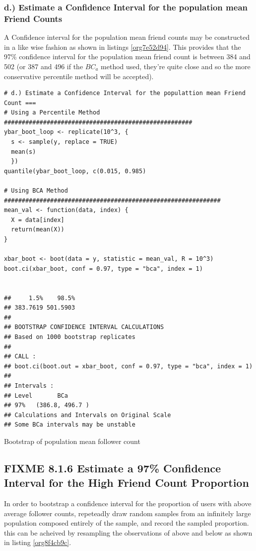 \documentclass[11pt]{article}
\begin{document}
\subsubsection{d.) Estimate a Confidence Interval for the population mean Friend Counts}
\label{sec:orgb95435c}
A Confidence interval for the population mean friend counts may be constructed in a like wise fashion as shown in listings \ref{org7e52d94}. This provides that the 97\% confidence interval for the population mean friend count is between 384 and 502 (or 387 and 496 if the \(BC_{a}\) method used, they're quite close and so the more conservative percentile method will be accepted).

\begin{listing}[htbp]
\begin{verbatim}
# d.) Estimate a Confidence Interval for the populattion mean Friend Count ===
# Using a Percentile Method #####################################################
ybar_boot_loop <- replicate(10^3, {
  s <- sample(y, replace = TRUE)
  mean(s)
  })
quantile(ybar_boot_loop, c(0.015, 0.985)

# Using BCA Method #############################################################
mean_val <- function(data, index) {
  X = data[index]
  return(mean(X))
}

xbar_boot <- boot(data = y, statistic = mean_val, R = 10^3)
boot.ci(xbar_boot, conf = 0.97, type = "bca", index = 1)


##     1.5%    98.5%
## 383.7619 501.5903
##
## BOOTSTRAP CONFIDENCE INTERVAL CALCULATIONS
## Based on 1000 bootstrap replicates
##
## CALL :
## boot.ci(boot.out = xbar_boot, conf = 0.97, type = "bca", index = 1)
##
## Intervals :
## Level       BCa
## 97%   (386.8, 496.7 )
## Calculations and Intervals on Original Scale
## Some BCa intervals may be unstable
\end{verbatim}
\caption{\label{org7e52d94}Bootstrap of population mean follower count}
\end{listing}

\subsection{{\bfseries\sffamily FIXME} 8.1.6 Estimate a 97\% Confidence Interval for the High Friend Count Proportion}
\label{sec:org9d5a329}
In order to bootstrap a confidence interval for the proportion of users with
above average follower counts, repeteadly draw random samples from an infinitely
large population composed entirely of the sample, and record the sampled
proportion. this can be acheived by resampling the observations of above and
below as shown in listing \ref{org8f4cb9c}.
\end{document}
